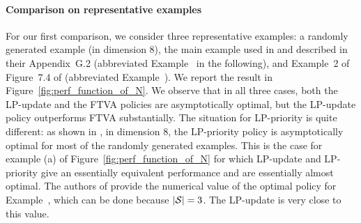 \paragraph{Comparison on representative examples} For our first comparison, we consider three representative examples: a randomly generated example (in dimension 8), the main example used in \cite{HXCW23} and described in their Appendix~G.2 (abbreviated Example~\cite{HXCW23} in the following), and Example~2 of Figure~7.4 of \cite{chen:tel-04068056} (abbreviated Example~\cite{chen:tel-04068056}). We report the result in Figure~\ref{fig:perf_function_of_N}. We observe that in all three cases, both the LP-update and the FTVA policies are asymptotically optimal, but the LP-update policy outperforms FTVA substantially. The situation for LP-priority is quite different: as shown in \cite{GGY23}, in dimension 8, the LP-priority policy is asymptotically optimal for most of the randomly generated examples. This is the case for example (a) of Figure~\ref{fig:perf_function_of_N} for which LP-update and LP-priority give an essentially equivalent performance and are essentially almost optimal. The authors of \cite{chen:tel-04068056} provide the numerical value of the optimal policy for Example~\cite{chen:tel-04068056}, which can be done because $|\mathcal{S}|=3$. %
The LP-update is very close to this value.



